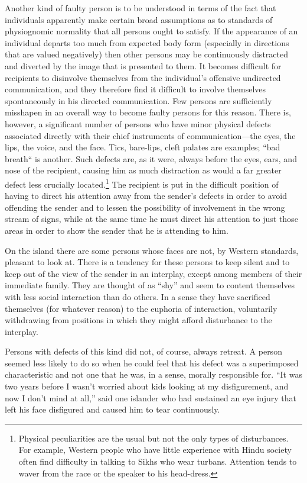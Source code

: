 \documentclass[twoside,symmetric,nobib,justified]{tufte-book}
\begin{document}
Another kind of faulty person is to be understood in terms of the fact
that individuals apparently make certain broad assumptions as to
standards of physiognomic normality that all persons ought to satisfy.
If the appearance of an individual departs too much from expected body
form (especially in directions that are valued negatively) then other
persons may be continuously distracted and diverted by the image that is
presented to them. It becomes difficult for recipients to disinvolve
themselves from the individual's offensive undirected communication, and
they therefore find it difficult to involve themselves spontaneously in
his directed communication. Few persons are sufficiently misshapen in an
overall way to become faulty persons for this reason. There is, however,
a significant number of persons who have minor physical defects
associated directly with their chief instruments of communication---the
eyes, the lips, the voice, and the face. Tics, bare-lips, cleft palates
are examples; ``bad breath`` is another. Such defects are, as it were,
always before the eyes, ears, and nose of the recipient, causing him as
much distraction as would a far greater defect less crucially
located.\footnote{Physical peculiarities are the usual but not the only
  types of disturbances. For example, Western people who have little
  experience with Hindu society often find difficulty in talking to
  Sikhs who wear turbans. Attention tends to waver from the race or the
  speaker to his head-dress.} The recipient is put in the difficult
position of having to direct his attention away from the sender's
defects in order to avoid offending the sender and to lessen the
possibility of involvement in the wrong stream of signs, while at the
same time he must direct his attention to just those areas in order to
show the sender that he is attending to him.

On the island there are some persons whose faces are not, by Western
standards, pleasant to look at. There is a tendency for these persons to
keep silent and to keep out of the view of the sender in an interplay,
except among members of their immediate family. They are thought of as
``shy'' and seem to content themselves with less social interaction than
do others. In a sense they have sacrificed themselves (for whatever
reason) to the euphoria of interaction, voluntarily withdrawing from
positions in which they might afford disturbance to the interplay.

\newpage Persons with defects of this kind did not, of course, always retreat. A
person seemed less likely to do so when he could feel that his defect
was a superimposed characteristic and not one that he was, in a sense,
morally responsible for. ``It was two years before I wasn't worried
about kids looking at my disfigurement, and now I don't mind at all,''
said one islander who had sustained an eye injury that left his face
disfigured and caused him to tear continuously.
\end{document}
